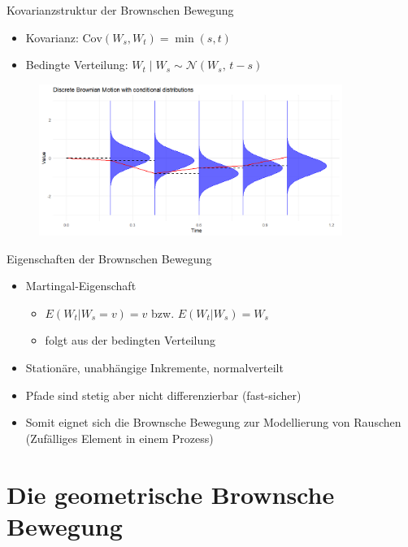 \documentclass{beamer}
\begin{document}
\begin{frame}{Kovarianzstruktur der Brownschen Bewegung}
  \begin{itemize}
    \item Kovarianz: $\mathrm{Cov}(W_s,W_t)=\min(s,t)$
    \item Bedingte Verteilung: $W_t \mid W_s \sim \mathcal N(W_s,\, t-s)$
  \end{itemize}
  \begin{figure}
    \centering
  \includegraphics[width=0.88\textwidth]{../thesis/images/bb_with_cov_wide.png}
  \end{figure}
\end{frame}

\begin{frame}{Eigenschaften der Brownschen Bewegung}
  \begin{itemize}
      \item Martingal-Eigenschaft
      \begin{itemize}
        \item $E(W_t | W_s = v) = v$ bzw. $E(W_t | W_s) = W_s$
        \item folgt aus der bedingten Verteilung
      \end{itemize}
      \item Stationäre, unabhängige Inkremente, normalverteilt
      \item Pfade sind stetig aber nicht differenzierbar (fast-sicher)
      \item Somit eignet sich die Brownsche Bewegung zur Modellierung von Rauschen (Zufälliges Element in einem Prozess)
  \end{itemize}
\end{frame}

\section{Die geometrische Brownsche Bewegung}
\end{document}
